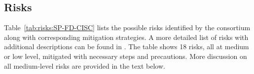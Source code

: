  

\subsection{Risks}

Table~\ref{tab:risks:SP-FD-CISC}  %
lists the possible risks identified by the  consortium along with corresponding mitigation strategies. %
A more detailed list of risks with additional descriptions can be found in \cite{bib:docdb7192}. The table shows 18 risks, all at medium or low level, mitigated with necessary steps and precautions. More discussion on all medium-level risks are provided in the text below. 
